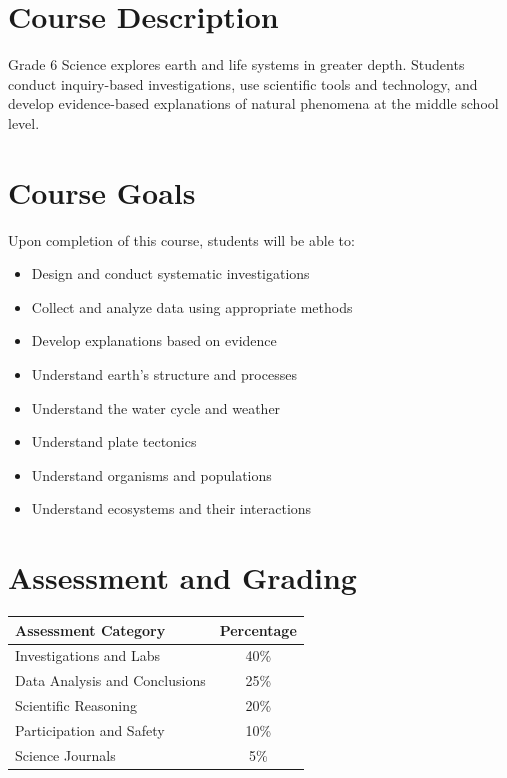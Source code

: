 \documentclass[11pt,letterpaper]{report}
\begin{document}
\section{Course Description}

Grade 6 Science explores earth and life systems in greater depth. Students conduct inquiry-based investigations, use scientific tools and technology, and develop evidence-based explanations of natural phenomena at the middle school level.

\section{Course Goals}

Upon completion of this course, students will be able to:

\begin{itemize}
    \item Design and conduct systematic investigations
    \item Collect and analyze data using appropriate methods
    \item Develop explanations based on evidence
    \item Understand earth's structure and processes
    \item Understand the water cycle and weather
    \item Understand plate tectonics
    \item Understand organisms and populations
    \item Understand ecosystems and their interactions
\end{itemize}

\section{Assessment and Grading}

\begin{center}
\begin{tabular}{|l|c|}
\hline
\textbf{Assessment Category} & \textbf{Percentage} \\
\hline
Investigations and Labs & 40\% \\
\hline
Data Analysis and Conclusions & 25\% \\
\hline
Scientific Reasoning & 20\% \\
\hline
Participation and Safety & 10\% \\
\hline
Science Journals & 5\% \\
\hline
\end{tabular}
\end{center}
\end{document}
